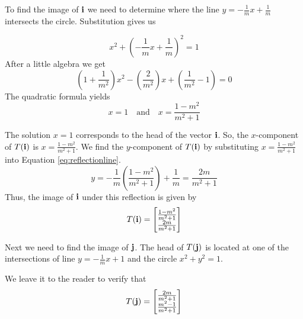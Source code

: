 \documentclass{ximera}
\renewcommand{\vec}[1]{{\bf #1}}
\begin{document}
   
   To find the image of $\vec{i}$ we need to determine where the line  $y=-\frac{1}{m}x+\frac{1}{m}$ intersects the circle.  Substitution gives us
   
   $$x^2+\left(-\frac{1}{m}x+\frac{1}{m}\right)^2=1$$
   After a little algebra we get
   $$\left(1+\frac{1}{m^2}\right)x^2-\left(\frac{2}{m^2}\right)x+\left(\frac{1}{m^2}-1\right)=0$$
   The quadratic formula yields 
   $$x=1\quad\text{and}\quad x=\frac{1-m^2}{m^2+1}$$
   
   The solution $x=1$ corresponds to the head of the vector $\vec{i}$.  So, the $x$-component of $T(\vec{i})$ is $x=\frac{1-m^2}{m^2+1}$.  We find the $y$-component of $T(\vec{i})$ by
   substituting $x=\frac{1-m^2}{m^2+1}$ into Equation \ref{eq:reflectionline}.
   $$ y=-\frac{1}{m}\left(\frac{1-m^2}{m^2+1}\right)+\frac{1}{m}=\frac{2m}{m^2+1}$$
   Thus, the image of $\vec{i}$ under this reflection is given by
   $$T(\vec{i})=\begin{bmatrix}\frac{1-m^2}{m^2+1}\\\frac{2m}{m^2+1}\end{bmatrix}$$
   
Next we need to find the image of $\vec{j}$. The head of $T(\vec{j})$ is located at one of the intersections of line $y=-\frac{1}{m}x+1$ and the circle $x^2+y^2=1$.  
   
  \begin{center}
  \end{center}

We leave it to the reader to verify that
\begin{equation}\label{eq:imageofj} T(\vec{j})=\begin{bmatrix}\frac{2m}{m^2+1}\\\frac{m^2-1}{m^2+1}\end{bmatrix}\end{equation}
\end{document}
